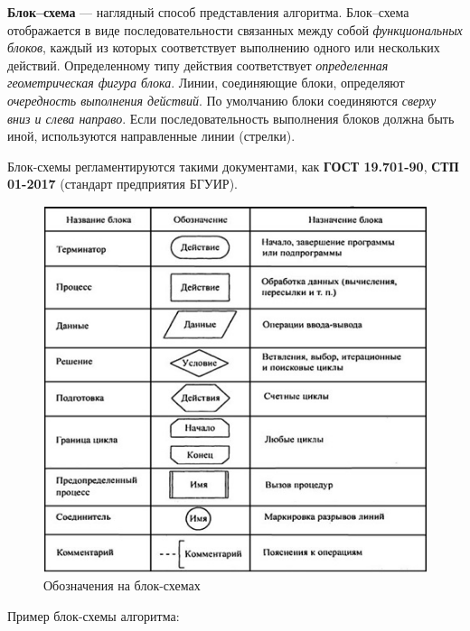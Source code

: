 \textbf{Блок--схема} --- наглядный способ представления алгоритма.
Блок--схема отображается в виде последовательности связанных между собой
\emph{функциональных блоков}, каждый из которых соответствует выполнению
одного или нескольких действий. Определенному типу действия
соответствует \emph{определенная геометрическая фигура блока}. Линии,
соединяющие блоки, определяют \emph{очередность выполнения действий}. По
умолчанию блоки соединяются \emph{сверху вниз и слева направо}. Если
последовательность выполнения блоков должна быть иной, используются
направленные линии (стрелки).

Блок-схемы регламентируются такими документами, как \textbf{ГОСТ
19.701-90}, \textbf{СТП 01-2017} (стандарт предприятия БГУИР).

\begin{figure}
\centering
\includegraphics{./res/schematics.png}
\caption{Обозначения на блок-схемах}
\end{figure}

Пример блок-схемы алгоритма:
